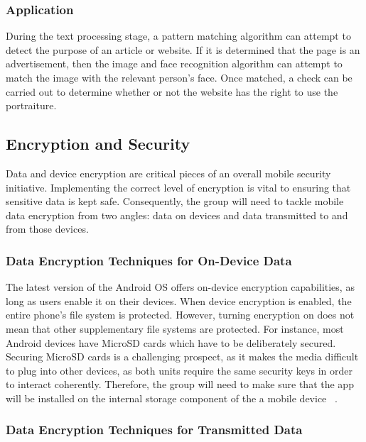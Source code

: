     \subsubsection{Application}

      During the text processing stage, a pattern matching algorithm can attempt to detect the purpose of an article or website. If it is determined that the page is an advertisement, then the image and face recognition algorithm can attempt to match the image with the relevant person's face. Once matched, a check can be carried out to determine whether or not the website has the right to use the portraiture.

\clearpage

\subsection{Encryption and Security}

Data and device encryption are critical pieces of an overall mobile security initiative. Implementing the correct level of encryption is vital to ensuring that sensitive data is kept safe. Consequently, the group will need to tackle mobile data encryption from two angles: data on devices and data transmitted to and from those devices.

\subsubsection{Data Encryption Techniques for On-Device Data}

The latest version of the Android OS offers on-device encryption capabilities, as long as users enable it on their devices. When device encryption is enabled, the entire phone's file system is protected. However, turning encryption on does not mean that other supplementary file systems are protected. For instance, most Android devices have MicroSD cards which have to be deliberately secured. Securing MicroSD cards is a challenging prospect, as it makes the media difficult to plug into other devices, as both units require the same security keys in order to interact coherently. Therefore, the group will need to make sure that the app will be installed on the internal storage component of the a mobile device ~\parencite{web:mobile_data_encryption_techniques}.

\subsubsection{Data Encryption Techniques for Transmitted Data}

